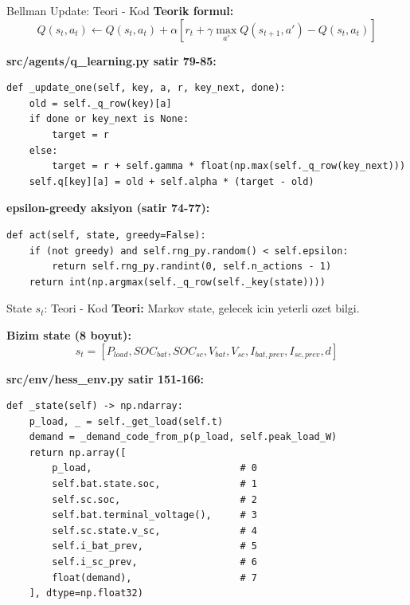 \documentclass[10pt,aspectratio=169]{beamer}
\begin{document}
\begin{frame}[fragile]{Bellman Update: Teori - Kod}
\textbf{Teorik formul:}
\[
Q(s_t, a_t) \leftarrow Q(s_t, a_t) + \alpha[r_t + \gamma \max_{a'} Q(s_{t+1}, a') - Q(s_t, a_t)]
\]

\textbf{src/agents/q\_learning.py satir 79-85:}
\begin{lstlisting}[style=py]
def _update_one(self, key, a, r, key_next, done):
    old = self._q_row(key)[a]
    if done or key_next is None:
        target = r
    else:
        target = r + self.gamma * float(np.max(self._q_row(key_next)))
    self.q[key][a] = old + self.alpha * (target - old)
\end{lstlisting}

\textbf{epsilon-greedy aksiyon (satir 74-77):}
\begin{lstlisting}[style=py]
def act(self, state, greedy=False):
    if (not greedy) and self.rng_py.random() < self.epsilon:
        return self.rng_py.randint(0, self.n_actions - 1)
    return int(np.argmax(self._q_row(self._key(state))))
\end{lstlisting}
\end{frame}

\begin{frame}[fragile]{State $s_t$: Teori - Kod}
\textbf{Teori:} Markov state, gelecek icin yeterli ozet bilgi.

\vspace{0.2em}
\textbf{Bizim state (8 boyut):}
\[
s_t = [P_{load}, SOC_{bat}, SOC_{sc}, V_{bat}, V_{sc}, I_{bat,prev}, I_{sc,prev}, d]
\]

\vspace{0.2em}
\textbf{src/env/hess\_env.py satir 151-166:}
\begin{lstlisting}[style=py]
def _state(self) -> np.ndarray:
    p_load, _ = self._get_load(self.t)
    demand = _demand_code_from_p(p_load, self.peak_load_W)
    return np.array([
        p_load,                          # 0
        self.bat.state.soc,              # 1
        self.sc.soc,                     # 2
        self.bat.terminal_voltage(),     # 3
        self.sc.state.v_sc,              # 4
        self.i_bat_prev,                 # 5
        self.i_sc_prev,                  # 6
        float(demand),                   # 7
    ], dtype=np.float32)
\end{lstlisting}
\end{frame}
\end{document}
